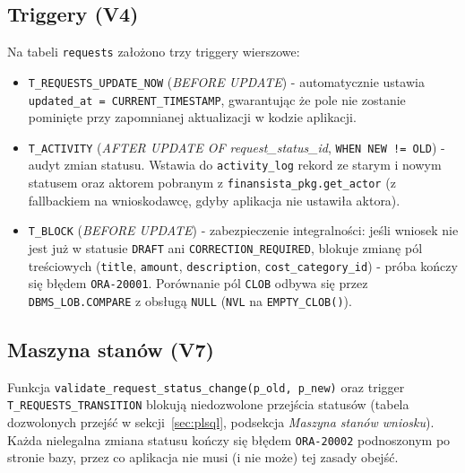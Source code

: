 \documentclass[12pt,a4paper]{article}
\begin{document}
\subsection{Triggery (V4)}
Na tabeli \texttt{requests} założono trzy triggery wierszowe:

\begin{itemize}[leftmargin=*]
  \item \texttt{T\_REQUESTS\_UPDATE\_NOW} (\emph{BEFORE UPDATE}) - automatycznie
        ustawia \texttt{updated\_at = CURRENT\_TIMESTAMP}, gwarantując że pole
        nie zostanie pominięte przy zapomnianej aktualizacji w kodzie aplikacji.
  \item \texttt{T\_ACTIVITY} (\emph{AFTER UPDATE OF request\_status\_id},
        \texttt{WHEN NEW != OLD}) - audyt zmian statusu. Wstawia do
        \texttt{activity\_log} rekord ze starym i nowym statusem oraz aktorem
        pobranym z \texttt{finansista\_pkg.get\_actor} (z fallbackiem na
        wnioskodawcę, gdyby aplikacja nie ustawiła aktora).
  \item \texttt{T\_BLOCK} (\emph{BEFORE UPDATE}) - zabezpieczenie integralności:
        jeśli wniosek nie jest już w statusie \texttt{DRAFT} ani
        \texttt{CORRECTION\_REQUIRED}, blokuje zmianę pól treściowych
        (\texttt{title}, \texttt{amount}, \texttt{description},
        \texttt{cost\_category\_id}) - próba kończy się błędem
        \texttt{ORA-20001}. Porównanie pól \texttt{CLOB} odbywa się przez
        \texttt{DBMS\_LOB.COMPARE} z obsługą \texttt{NULL} (\texttt{NVL}
        na \texttt{EMPTY\_CLOB()}).
\end{itemize}

\subsection{Maszyna stanów (V7)}
Funkcja \texttt{validate\_request\_status\_change(p\_old, p\_new)} oraz trigger
\texttt{T\_REQUESTS\_TRANSITION} blokują niedozwolone przejścia statusów
(tabela dozwolonych przejść w sekcji~\ref{sec:plsql}, podsekcja \emph{Maszyna stanów wniosku}).
Każda nielegalna zmiana statusu kończy się błędem \texttt{ORA-20002} podnoszonym
po stronie bazy, przez co aplikacja nie musi (i nie może) tej zasady obejść.
\end{document}
